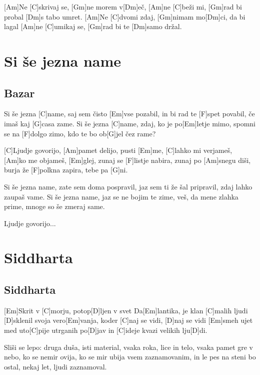 \documentclass[a4paper,12pt]{article}
\begin{document}
\begin{multicols}{2}
\begin{guitar}
[Am C Gm Dm]


[Am]Ne   [C]skrivaj se, [Gm]ne morem v[Dm]eč,
[Am]ne   [C]beži mi, [Gm]rad bi probal [Dm]s tabo umret.
[Am]Ne   [C]dvomi zdaj, [Gm]nimam mo[Dm]ci, da bi lagal
[Am]ne   [C]umikaj se, [Gm]rad bi te [Dm]samo držal.

\end{guitar}
\section{Si še jezna name}
\subsection*{Bazar}
\begin{guitar}
[C]Si še jezna [C]name, 
saj sem čisto [Em]vse pozabil,
in bi rad te [F]spet povabil, 
če imaš kaj [G]casa zame.
Si še jezna [C]name, zdaj, 
ko je po[Em]letje mimo,
spomni se na [F]dolgo zimo, 
kdo te bo ob[G]jel čez rame?



[C]Ljudje govorijo, [Am]pamet delijo, pusti [Em]me, 
[C]lahko mi verjameš, [Am]ko me objameš, [Em]glej,
zunaj se [F]listje nabira, zunaj po [Am]snegu diši, 
burja že [F]polkna zapira, tebe pa [G]ni. 



Si še jezna name, 
zate sem doma pospravil,
jaz sem ti že šal pripravil, 
zdaj lahko zaupaš vame. 
Si še jezna name, 
jaz se ne bojim te zime,
veš, da mene zlahka prime, 
mnoge so še zmeraj same. 



Ljudje govorijo...

\end{guitar}
\section{Siddharta}
\subsection*{Siddharta}
\begin{guitar}
[Em C D Em C D Em]

[Em]Skrit v [C]morju,
potop[D]ljen v svet Da[Em]lantika,
je klan [C]malih ljudi
[D]sklenil svoja vero[Em]vanja,
koder [C]naj se vidi,
[D]naj se vidi [Em]smeh ujet
med uto[C]pije utrganih po[D]jav
in [C]ideje kvazi velikih lju[D]di.


Sliši se lepo:
druga duša, isti material,
vsaka roka, lice in telo,
vsaka pamet gre v nebo,
ko se nemir ovija,
ko se mir ubija vsem zaznamovanim,
in le pes na steni bo ostal,
nekaj let, ljudi zaznamoval.



\end{guitar}
\end{multicols}
\end{document}
